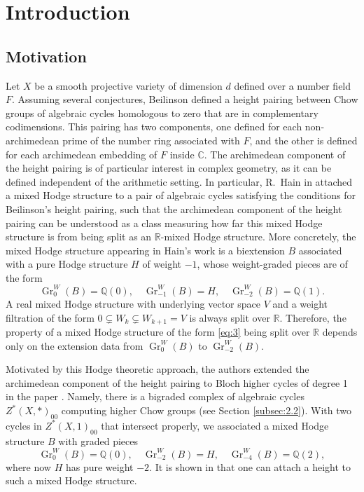 \documentclass[11pt,a4paper]{amsart}
\newcommand{\C}{\mathds{C}}
\newcommand{\Q}{\mathds{Q}}
\newcommand{\R}{\mathds{R}}
\DeclareMathOperator {\Gr} {Gr}
\numberwithin{equation}{section}
\theoremstyle{plain}
\theoremstyle{definition}
\begin{document}
\maketitle

\tableofcontents{}

\section*{Introduction}
\label{sec:introduction}
\subsection*{Motivation}
Let $X$ be a smooth projective variety of dimension $d$ defined over a
number field $F$. Assuming several conjectures, Beilinson defined a height
pairing between Chow groups of algebraic cycles homologous to zero
that are in complementary codimensions. This pairing has two
components, one defined for each non-archimedean prime of the number
ring associated with $F$, and the other is defined for each archimedean
embedding of $F$ inside $\C$. The archimedean component of the height pairing is of particular interest in complex geometry, as it can be defined independent of the arithmetic setting. In particular,
R.~Hain in \cite{Hain:Height} attached a mixed Hodge structure to a
pair of algebraic cycles satisfying the conditions for Beilinson's
height pairing, such that the archimedean component of the height
pairing can be understood as a class measuring how far this mixed
Hodge structure is from being split as an $\R$-mixed Hodge
structure. More concretely, the mixed Hodge structure appearing in
Hain's  
work is a biextension $B$ associated with a pure Hodge structure $H$
of weight $-1$, whose weight-graded pieces are of the form
\begin{equation}\label{eq:3}
  \Gr_{0}^{W}(B)=\Q(0),\quad \Gr_{-1}^{W}(B)=H,\quad
  \Gr_{-2}^{W}(B)=\Q(1).
\end{equation}
A real mixed Hodge structure with underlying vector space $V$ and a weight filtration of the form 
 $0\subsetneq W_k\subsetneq W_{k+1}=V$ is always split over $\R$.  Therefore, the property 
   of a mixed Hodge structure of the form \eqref{eq:3} being split over $\R$ depends only on the extension 
   data from $\Gr^W_0(B)$ to $\Gr^W_{-2}(B)$. 

Motivated by this Hodge theoretic approach,  the authors
extended the archimedean component of the height 
pairing  to Bloch higher cycles of 
degree 1  in the paper
\cite{BGGP:Height}. Namely, there is a bigraded complex of algebraic cycles 
$Z^{\ast}(X,\ast)_{00}$ computing
higher Chow  groups (see  Section \ref{subsec:2.2}).
With two cycles in 
$Z^{\ast}(X,1)_{00}$ that intersect properly, we associated a
mixed Hodge structure $B$ with graded pieces 
\begin{equation}\label{eq:1}
  \Gr_{0}^{W}(B)=\Q(0),\quad \Gr_{-2}^{W}(B)=H,\quad
  \Gr_{-4}^{W}(B)=\Q(2),
\end{equation}
where now $H$ has pure weight $-2$. It is shown in
\cite{BGGP:Height} 
that one can attach a height to such a mixed Hodge structure.
\end{document}
